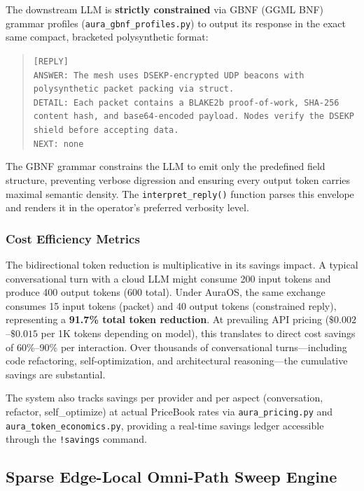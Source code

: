 \documentclass[11pt]{article}
\begin{document}
The downstream LLM is \textbf{strictly constrained} via GBNF (GGML BNF) grammar profiles (\texttt{aura\_gbnf\_profiles.py}) to output its response in the exact same compact, bracketed polysynthetic format:

\begin{quote}
\small\texttt{[REPLY]\\
ANSWER: The mesh uses DSEKP-encrypted UDP beacons with polysynthetic packet packing via struct.\\
DETAIL: Each packet contains a BLAKE2b proof-of-work, SHA-256 content hash, and base64-encoded payload. Nodes verify the DSEKP shield before accepting data.\\
NEXT: none\\
[/REPLY]}
\end{quote}

The GBNF grammar constrains the LLM to emit only the predefined field structure, preventing verbose digression and ensuring every output token carries maximal semantic density. The \texttt{interpret\_reply()} function parses this envelope and renders it in the operator's preferred verbosity level.

\subsubsection{Cost Efficiency Metrics}

The bidirectional token reduction is multiplicative in its savings impact. A typical conversational turn with a cloud LLM might consume 200 input tokens and produce 400 output tokens (600 total). Under AuraOS, the same exchange consumes 15 input tokens (packet) and 40 output tokens (constrained reply), representing a \textbf{91.7\% total token reduction}. At prevailing API pricing ($\$0.002$--$\$0.015$ per 1K tokens depending on model), this translates to direct cost savings of 60\%--90\% per interaction. Over thousands of conversational turns—including code refactoring, self-optimization, and architectural reasoning—the cumulative savings are substantial.

The system also tracks savings per provider and per aspect (conversation, refactor, self\_optimize) at actual PriceBook rates via \texttt{aura\_pricing.py} and \texttt{aura\_token\_economics.py}, providing a real-time savings ledger accessible through the \texttt{!savings} command.

\subsection{Sparse Edge-Local Omni-Path Sweep Engine}
\end{document}
